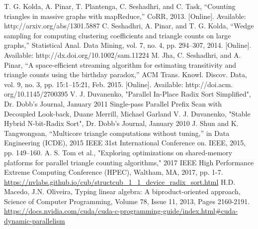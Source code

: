 \documentclass[conference]{IEEEtran}
\begin{document}
\begin{thebibliography}{00}
 T. G. Kolda, A. Pinar, T. Plantenga, C. Seshadhri, and C. Task, “Counting triangles in massive graphs with mapReduce,” CoRR, 2013. [Online]. Available: http://arxiv.org/abs/1301.5887
  C. Seshadhri, A. Pinar, and T. G. Kolda, “Wedge sampling for computing clustering coefficients and triangle counts on large graphs,” Statistical Anal. Data Mining, vol. 7, no. 4, pp. 294–307, 2014. [Online]. Available: http://dx.doi.org/10.1002/sam.11224
 M. Jha, C. Seshadhri, and A. Pinar, “A space-efficient streaming algorithm for estimating transitivity and triangle counts using the birthday paradox,” ACM Trans. Knowl. Discov. Data, vol. 9, no. 3, pp. 15:1–15:21, Feb. 2015. [Online]. Available: http://doi.acm. org/10.1145/2700395
 V. J. Duvanenko, "Parallel In-Place Radix Sort Simplified", Dr. Dobb's Journal, January 2011
 Single-pass Parallel Prefix Scan with Decoupled Look-back, Duane Merrill, Michael Garland
 V. J. Duvanenko, "Stable Hybrid N-bit-Radix Sort", Dr. Dobb's Journal, January 2010
 J. Shun and K. Tangwongsan, “Multicore triangle computations without tuning,” in Data Engineering (ICDE), 2015 IEEE 31st International Conference on. IEEE, 2015, pp. 149–160.
 A. S. Tom et al., "Exploring optimizations on shared-memory platforms for parallel triangle counting algorithms," 2017 IEEE High Performance Extreme Computing Conference (HPEC), Waltham, MA, 2017, pp. 1-7.
 \url{https://nvlabs.github.io/cub/structcub_1_1_device_radix_sort.html}
 H.D. Macedo, J.N. Oliveira, Typing linear algebra: A biproduct-oriented approach, Science of Computer Programming, Volume 78, Issue 11, 2013, Pages 2160-2191.
 \url{https://docs.nvidia.com/cuda/cuda-c-programming-guide/index.html#cuda-dynamic-parallelism}
\end{thebibliography}
\end{document}
